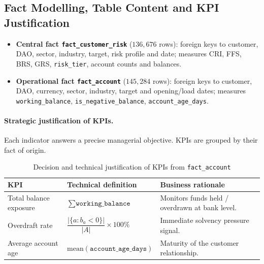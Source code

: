 \subsection{Fact Modelling, Table Content and KPI Justification}
\begin{itemize}
    \item \textbf{Central fact \texttt{fact\_customer\_risk}} ($136{,}676$ rows):
          foreign keys to customer, DAO, sector, industry, target, risk profile and
          date; measures CRI, FFS, BRS, GRS, \texttt{risk\_tier}, account counts and
          balances.
    \item \textbf{Operational fact \texttt{fact\_account}} ($145{,}284$ rows):
          foreign keys to customer, DAO, currency, sector, industry, target and
          opening/load dates; measures \texttt{working\_balance},
          \texttt{is\_negative\_balance}, \texttt{account\_age\_days}.
\end{itemize}

\paragraph{Strategic justification of KPIs.}
Each indicator answers a precise managerial objective. KPIs are grouped by their
fact of origin.

\begin{table}[H]
\centering
\caption{Decision and technical justification of KPIs from \texttt{fact\_account}}
\label{tab:kpi_fact_account}
\renewcommand{\arraystretch}{1.2}
\scriptsize
\begin{tabular}{|p{3.5cm}|p{5.0cm}|p{6.0cm}|}
\hline
\rowcolor{blue!25}
\textbf{KPI} & \textbf{Technical definition} & \textbf{Business rationale} \\
\hline
Total balance exposure & $\sum \texttt{working\_balance}$ & Monitors funds held / overdrawn at bank level. \\
\hline
Overdraft rate & $\dfrac{|\{a: b_a<0\}|}{|A|}\times 100\%$ & Immediate solvency pressure signal. \\
\hline
Average account age & $\mathrm{mean}(\texttt{account\_age\_days})$ & Maturity of the customer relationship. \\
\hline
\end{tabular}
\end{table}

